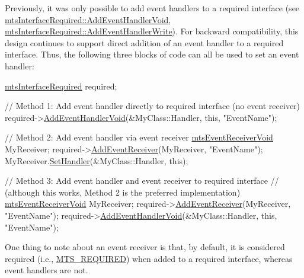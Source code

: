 Previously, it was only possible to add event handlers to a required interface (see \hyperlink{classmts_interface_required_a195ee62f3fa85dbfd1ce92cb1f745603}{mts\-Interface\-Required\-::\-Add\-Event\-Handler\-Void}, \hyperlink{classmts_interface_required_a5259260a2f54575de9bbe8b2636430b8}{mts\-Interface\-Required\-::\-Add\-Event\-Handler\-Write}). For backward compatibility, this design continues to support direct addition of an event handler to a required interface. Thus, the following three blocks of code can all be used to set an event handler\-:


\begin{DoxyCode}
\hyperlink{classmts_interface_required}{mtsInterfaceRequired} required;

\textcolor{comment}{// Method 1: Add event handler directly to required interface (no event receiver)}
required->\hyperlink{classmts_interface_required_a195ee62f3fa85dbfd1ce92cb1f745603}{AddEventHandlerVoid}(&MyClass::Handler, \textcolor{keyword}{this}, \textcolor{stringliteral}{"EventName"});

\textcolor{comment}{// Method 2: Add event handler via event receiver}
\hyperlink{classmts_event_receiver_void}{mtsEventReceiverVoid} MyReceiver;
required->\hyperlink{classmts_interface_required_aa9146d63a8b06974615f36e01151e143}{AddEventReceiver}(MyReceiver, \textcolor{stringliteral}{"EventName"});
MyReceiver.\hyperlink{classmts_event_receiver_void_afe4089691c2e13f94b76f595976552fb}{SetHandler}(&MyClass::Handler, \textcolor{keyword}{this});

\textcolor{comment}{// Method 3: Add event handler and event receiver to required interface}
\textcolor{comment}{//           (although this works, Method 2 is the preferred implementation)}
\hyperlink{classmts_event_receiver_void}{mtsEventReceiverVoid} MyReceiver;
required->\hyperlink{classmts_interface_required_aa9146d63a8b06974615f36e01151e143}{AddEventReceiver}(MyReceiver, \textcolor{stringliteral}{"EventName"});
required->\hyperlink{classmts_interface_required_a195ee62f3fa85dbfd1ce92cb1f745603}{AddEventHandlerVoid}(&MyClass::Handler, \textcolor{keyword}{this}, \textcolor{stringliteral}{"EventName"});
\end{DoxyCode}


One thing to note about an event receiver is that, by default, it is considered required (i.\-e., \hyperlink{mts_forward_declarations_8h_a9ef1ce54724afde7802db326ff8606f3ae01fd85391b60e546bbb1be9716c4ec9}{M\-T\-S\-\_\-\-R\-E\-Q\-U\-I\-R\-E\-D}) when added to a required interface, whereas event handlers are not.


